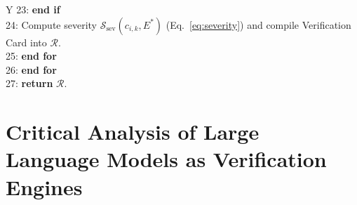 \documentclass[sigconf]{acmart}
\begin{document}
\begin{table}[t]
\begin{tabularx}{\columnwidth}{Y}
23: \hspace{1.3em} \textbf{end if} \\
24: \hspace{1.3em} Compute severity $\mathcal{S}_{\text{sev}}(c_{i,k}, E^*)$ (Eq.~\ref{eq:severity}) and compile Verification Card into $\mathcal{R}$. \\
25: \hspace{0.5em} \textbf{end for} \\
26: \textbf{end for} \\
27: \textbf{return} $\mathcal{R}$. \\
\bottomrule
\end{tabularx}
\end{table}

\section{Critical Analysis of Large Language Models as Verification Engines}
\label{sec:llm_critique}
\end{document}

